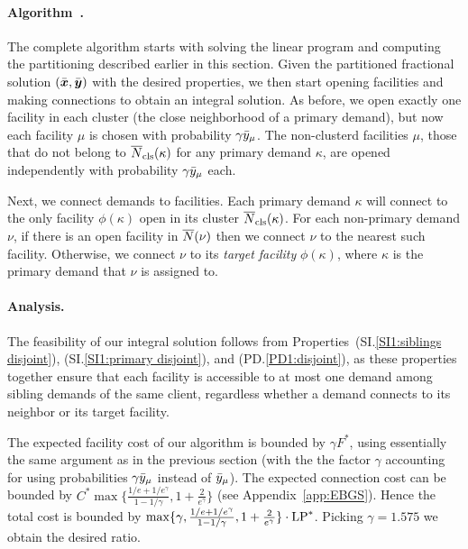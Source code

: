 \documentclass[11pt]{article}
\begin{document}

\paragraph{Algorithm~{\EBGS}.}
The complete algorithm starts with solving the linear program and
computing the partitioning described earlier in this section.
Given the partitioned fractional solution $(\bar{\boldsymbol{x}},
\bar{\boldsymbol{y}})$ with the desired properties, we then start opening
facilities and making connections to obtain an integral
solution. As before, we open exactly one facility in each
cluster (the close neighborhood of a primary demand), but
now each facility $\mu$ is chosen with probability
$\gamma{\bar y}_{\mu}$. The non-clusterd facilities $\mu$,
those that do not belong to ${\overline{N}}_{\text{cls}}(\kappa)$ for any
primary demand $\kappa$, are opened independently with
probability $\gamma{\bar y}_{\mu}$ each. 

Next, we connect demands to facilities.
Each primary demand $\kappa$ will connect
to the only facility $\phi(\kappa)$ open in its cluster
${\overline{N}}_{\text{cls}}(\kappa)$.  For each non-primary demand $\nu$, if
there is an open facility in ${\overline{N}}(\nu)$ then we connect
$\nu$ to the nearest such facility. Otherwise, we connect
$\nu$ to its \emph{target facility} $\phi(\kappa)$, where $\kappa$ is the primary
demand that $\nu$ is assigned to. 


\paragraph{Analysis.}
The feasibility of our integral solution follows from
Properties~(SI.\ref{SI1:siblings disjoint}), (SI.\ref{SI1:primary
  disjoint}), and (PD.\ref{PD1:disjoint}), as these properties together
ensure that each facility is accessible to at most one demand among
sibling demands of the same client, regardless whether a demand
connects to its neighbor or its target facility.

The expected facility cost of our algorithm is bounded by $\gamma
F^\ast$, using essentially the same argument as in the previous
section (with the the factor $\gamma$ accounting for using
probabilities $\gamma {\bar y}_{\mu}$ instead of ${\bar y}_{\mu}$). The
expected connection cost can be bounded by $C^\ast
\max\{\frac{1/e+1/e^\gamma}{1-1/\gamma}, 1+\frac{2}{e^\gamma}\}$ (see
Appendix~\ref{app:EBGS}).  Hence the total cost is bounded by
$\max\{\gamma, \frac{1/e+1/e^\gamma}{1-1/\gamma},
1+\frac{2}{e^\gamma}\}\cdot \mbox{\rm LP}^\ast$. Picking $\gamma=1.575$ we
obtain the desired ratio.
\end{document}
